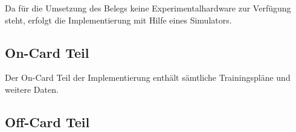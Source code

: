 \documentclass[a4paper,12pt]{scrartcl}
\begin{document}



Da für die Umsetzung des Belegs keine Experimentalhardware zur Verfügung steht, erfolgt die Implementierung mit Hilfe eines Simulators.

\subsection{On-Card Teil}
\label{subsec:3.2}
Der On-Card Teil der Implementierung enthält sämtliche Trainingspläne und weitere Daten.




\subsection{Off-Card Teil}
\label{subsec:3.3}

\end{document}
